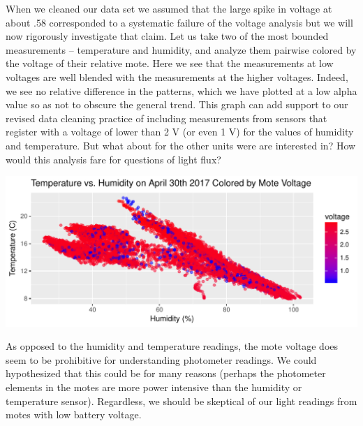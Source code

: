 \documentclass[english]{article}\usepackage[]{graphicx}\usepackage[]{color}
\makeatletter
\def\maxwidth{ %
  \ifdim\Gin@nat@width>\linewidth
    \linewidth
  \else
    \Gin@nat@width
  \fi
}
\newenvironment{knitrout}{}{} %
\makeatother
\begin{document}
When we cleaned our data set we assumed that the large spike in voltage
at about .58 corresponded to a systematic failure of the voltage analysis
but we will now rigorously investigate that claim.  Let us take two of the most
bounded measurements -- temperature and humidity, and analyze them pairwise 
colored by the voltage of their relative mote.  Here we see that the measurements
at low voltages are well blended with the measurements at the higher voltages.
Indeed, we see no relative difference in the patterns, which we have plotted at 
a low alpha value so as not to obscure the general trend.  This graph can add
support to our revised data cleaning practice of including measurements from 
sensors that register with a voltage of lower than 2 V (or even 1 V) for the values
of humidity and temperature.  But what about for the other units were are interested in?
How would this analysis fare for questions of light flux?


\begin{knitrout}
\color{fgcolor}

{\centering \includegraphics[width=\maxwidth]{figure/q1p1-1} 

}



\end{knitrout}

As opposed to the humidity and temperature readings, the mote voltage does seem to
be prohibitive for understanding photometer readings.  We could hypothesized that 
this could be for many reasons (perhaps the photometer elements in the motes are
more power intensive than the humidity or temperature sensor).  Regardless, we should
be skeptical of our light readings from motes with low battery voltage.
\end{document}
